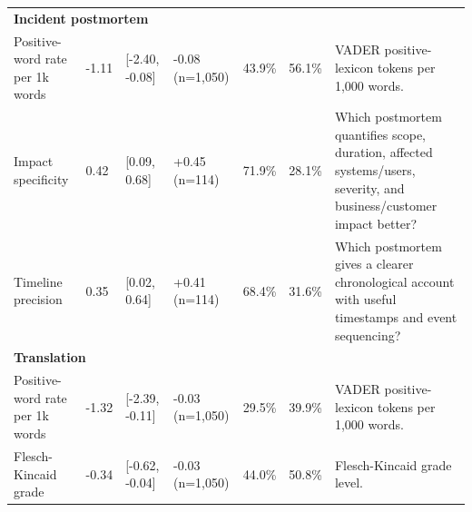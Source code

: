 \begin{longtable}{lllllll}
\multicolumn{7}{l}{\textbf{Incident postmortem}} \\
Positive-word rate per 1k words & -1.11 & [-2.40, -0.08] & -0.08 (n=1,050) & 43.9\% & 56.1\% & VADER positive-lexicon tokens per 1,000 words. \\
Impact specificity & 0.42 & [0.09, 0.68] & +0.45 (n=114) & 71.9\% & 28.1\% & Which postmortem quantifies scope, duration, affected systems/users, severity, and business/customer impact better? \\
Timeline precision & 0.35 & [0.02, 0.64] & +0.41 (n=114) & 68.4\% & 31.6\% & Which postmortem gives a clearer chronological account with useful timestamps and event sequencing? \\
\multicolumn{7}{l}{\textbf{Translation}} \\
Positive-word rate per 1k words & -1.32 & [-2.39, -0.11] & -0.03 (n=1,050) & 29.5\% & 39.9\% & VADER positive-lexicon tokens per 1,000 words. \\
Flesch-Kincaid grade & -0.34 & [-0.62, -0.04] & -0.03 (n=1,050) & 44.0\% & 50.8\% & Flesch-Kincaid grade level. \\
\end{longtable}
